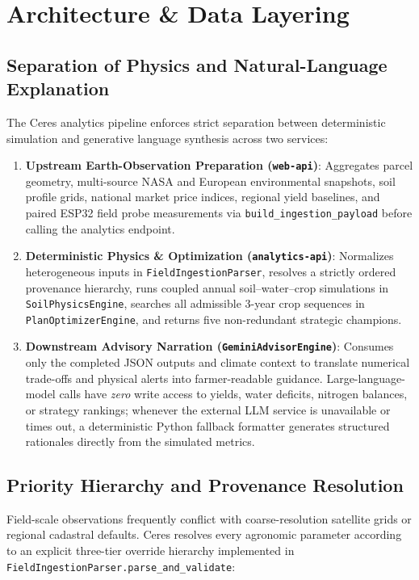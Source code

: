 \section{Architecture \& Data Layering}
\label{sec:architecture}

\subsection{Separation of Physics and Natural-Language Explanation}
The Ceres analytics pipeline enforces strict separation between deterministic simulation and generative language synthesis across two services:
\begin{enumerate}[leftmargin=1.5em]
  \item \textbf{Upstream Earth-Observation Preparation (\texttt{web-api})}: Aggregates parcel geometry, multi-source NASA and European environmental snapshots, soil profile grids, national market price indices, regional yield baselines, and paired ESP32 field probe measurements via \texttt{build\_ingestion\_payload} before calling the analytics endpoint.
  \item \textbf{Deterministic Physics \& Optimization (\texttt{analytics-api})}: Normalizes heterogeneous inputs in \texttt{FieldIngestionParser}, resolves a strictly ordered provenance hierarchy, runs coupled annual soil--water--crop simulations in \texttt{SoilPhysicsEngine}, searches all admissible 3-year crop sequences in \texttt{PlanOptimizerEngine}, and returns five non-redundant strategic champions.
  \item \textbf{Downstream Advisory Narration (\texttt{GeminiAdvisorEngine})}: Consumes only the completed JSON outputs and climate context to translate numerical trade-offs and physical alerts into farmer-readable guidance. Large-language-model calls have \emph{zero} write access to yields, water deficits, nitrogen balances, or strategy rankings; whenever the external LLM service is unavailable or times out, a deterministic Python fallback formatter generates structured rationales directly from the simulated metrics.
\end{enumerate}

\subsection{Priority Hierarchy and Provenance Resolution}
Field-scale observations frequently conflict with coarse-resolution satellite grids or regional cadastral defaults. Ceres resolves every agronomic parameter according to an explicit three-tier override hierarchy implemented in \texttt{FieldIngestionParser.parse\_and\_validate}:

